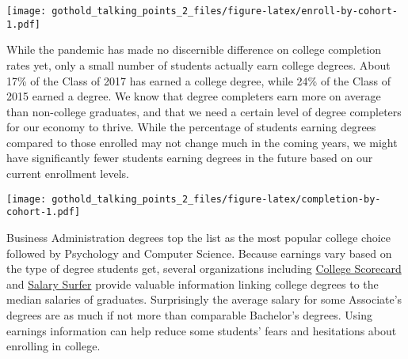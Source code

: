 \documentclass[
  11pt,
]{article}
\begin{document}
\vspace{3mm}

\texttt{[image: gothold\_talking\_points\_2\_files/figure-latex/enroll-by-cohort-1.pdf]}

\newpage{}


While the pandemic has made no discernible difference on college
completion rates yet, only a small number of students actually earn
college degrees. About 17\% of the Class of 2017 has earned a college
degree, while 24\% of the Class of 2015 earned a degree. We know that
degree completers earn more on average than non-college graduates, and
that we need a certain level of degree completers for our economy to
thrive. While the percentage of students earning degrees compared to
those enrolled may not change much in the coming years, we might have
significantly fewer students earning degrees in the future based on our
current enrollment levels.


\texttt{[image: gothold\_talking\_points\_2\_files/figure-latex/completion-by-cohort-1.pdf]}

\newpage{}


Business Administration degrees top the list as the most popular college
choice followed by Psychology and Computer Science. Because earnings
vary based on the type of degree students get, several organizations
including \href{https://collegescorecard.ed.gov/}{College Scorecard} and
\href{https://salarysurfer.cccco.edu/SalarySurfer.aspx}{Salary Surfer}
provide valuable information linking college degrees to the median
salaries of graduates. Surprisingly the average salary for some
Associate's degrees are as much if not more than comparable Bachelor's
degrees. Using earnings information can help reduce some students' fears
and hesitations about enrolling in college.
\end{document}
